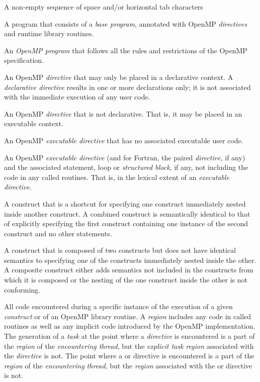 \glossarydefstart
A non-empty sequence of space and/or horizontal tab characters
\glossarydefend

\glossarydefstart
A program that consists of a \emph{base program}, annotated with OpenMP \emph{directives} and 
runtime library routines.
\glossarydefend

\glossarydefstart
An \emph{OpenMP program} that follows all the rules and restrictions of the OpenMP 
specification.
\glossarydefend

\glossarydefstart
An OpenMP \emph{directive} that may only be placed in a declarative context. A 
\emph{declarative directive} results in one or more declarations only; it is not associated 
with the immediate execution of any user code.
\glossarydefend

\glossarydefstart
An OpenMP \emph{directive} that is not declarative. That is, it may be placed in an 
executable context.
\glossarydefend

\glossarydefstart
An OpenMP \emph{executable directive} that has no associated executable user code.
\glossarydefend


\glossarydefstart
An OpenMP \emph{executable directive} (and for Fortran, the paired  \emph{directive}, if 
any) and the associated statement, loop or \emph{structured block}, if any, not including 
the code in any called routines. That is, in the lexical extent of an \emph{executable 
directive}.
\glossarydefend

\glossarydefstart
A construct that is a shortcut for specifying one construct immediately nested inside another construct. A combined construct is semantically identical to that of explicitly specifying the first construct containing one instance of the second construct and no other statements.
\glossarydefend

\glossarydefstart 
A construct that is composed of two constructs but does not have identical semantics to specifying one of the constructs immediately nested inside the other. A composite construct either adds semantics not included in the constructs from which it is composed or the nesting of the one construct inside the other is not conforming.
\glossarydefend


\glossarydefstart
All code encountered during a specific instance of the execution of a given 
\emph{construct} or of an OpenMP library routine. A \emph{region} includes any code in called 
routines as well as any implicit code introduced by the OpenMP implementation. 
The generation of a \emph{task} at the point where a  \emph{directive} is encountered is a 
part of the \emph{region} of the \emph{encountering thread}, but the \emph{explicit task region}
associated with the  \emph{directive} is not. The point where a  or 
directive is encountered is a part of the \emph{region} of the \emph{encountering thread}, but the 
\emph{region} associated with the  or  directive is not.

